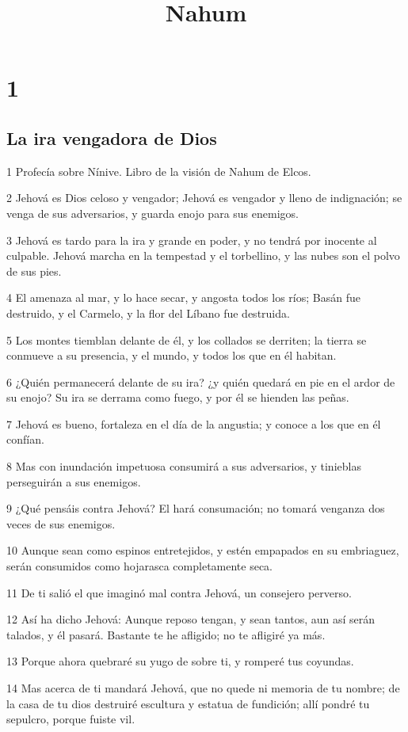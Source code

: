 

\title{Nahum}

\chapter{1}

\section*{La ira vengadora de Dios}

\par 1 Profecía sobre Nínive. Libro de la visión de Nahum de Elcos.
\par 2 Jehová es Dios celoso y vengador; Jehová es vengador y lleno de indignación; se venga de sus adversarios, y guarda enojo para sus enemigos.
\par 3 Jehová es tardo para la ira y grande en poder, y no tendrá por inocente al culpable. Jehová marcha en la tempestad y el torbellino, y las nubes son el polvo de sus pies.
\par 4 El amenaza al mar, y lo hace secar, y angosta todos los ríos; Basán fue destruido, y el Carmelo, y la flor del Líbano fue destruida.
\par 5 Los montes tiemblan delante de él, y los collados se derriten; la tierra se conmueve a su presencia, y el mundo, y todos los que en él habitan.
\par 6 ¿Quién permanecerá delante de su ira? ¿y quién quedará en pie en el ardor de su enojo? Su ira se derrama como fuego, y por él se hienden las peñas.
\par 7 Jehová es bueno, fortaleza en el día de la angustia; y conoce a los que en él confían.
\par 8 Mas con inundación impetuosa consumirá a sus adversarios, y tinieblas perseguirán a sus enemigos.
\par 9 ¿Qué pensáis contra Jehová? El hará consumación; no tomará venganza dos veces de sus enemigos.
\par 10 Aunque sean como espinos entretejidos, y estén empapados en su embriaguez, serán consumidos como hojarasca completamente seca.
\par 11 De ti salió el que imaginó mal contra Jehová, un consejero perverso.
\par 12 Así ha dicho Jehová: Aunque reposo tengan, y sean tantos, aun así serán talados, y él pasará. Bastante te he afligido; no te afligiré ya más.
\par 13 Porque ahora quebraré su yugo de sobre ti, y romperé tus coyundas.
\par 14 Mas acerca de ti mandará Jehová, que no quede ni memoria de tu nombre; de la casa de tu dios destruiré escultura y estatua de fundición; allí pondré tu sepulcro, porque fuiste vil.

